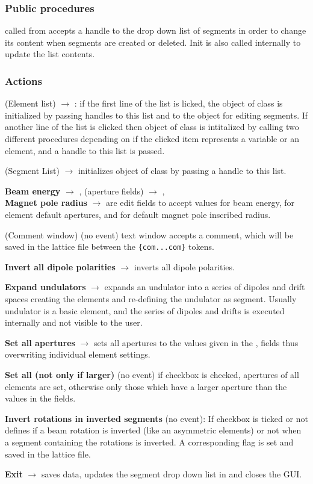 \documentclass[12pt]{article}
\newcommand\code[1]{{\tt #1}}
\newcommand{\ofld}[1]{\colorbox{black!15}{{\bf #1}}}
\newcommand{\ofldx}[1]{\colorbox{black!15}{(#1)}}
\newcommand\guico[1]{{\color{blue}\code{#1}}}
\newcommand{\unico}[1]{{\color{burntorange}\code{#1}}}
\newcommand{\evcod}[2]{\ofld{#1} $\rightarrow$ \guico{#2}}
\newcommand{\evcodx}[2]{\ofldx{#1} $\rightarrow$ \guico{#2}}
\newcommand{\opagui}[1]{\colorbox{blue!20}{{\color{black}\code{#1}}}}
\newcommand{\ogui}[1]{\hyperref[#1]{\opagui{#1}}}
\newcommand{\act}[1]{\subsubsection*{Actions} #1}
\newcommand{\ppro}[1]{\subsubsection*{Public procedures} #1}
\begin{document}
\ppro{
\guico{Init} called from \ogui{opamenu} accepts a handle to the drop down list of segments in order to change its content when segments are created or deleted. Init is also called internally to update the list contents.
}

\act{
\evcodx{Element list}{ListBoxEClick}: if the first line of the list is licked, the object \guico{EditElemCreate} of class \ogui{oelecreate} is initialized by passing handles to this list and to the \ogui{osegedit} object for editing segments. If another line of the list is clicked then object \guico{EditElemSet} of class \ogui{oeleedit} is intitalized by calling two different procedures depending on if the clicked item represents a variable or an element, and a handle to this list is passed.

\evcodx{Segment List}{ListBoxSClick} initializes object \guico{EditSegSet} of class \ogui{osegedit} by passing a handle to this list.

\evcod{Beam energy}{EditGloEKeyPress}, \evcodx{aperture fields}{EditA*KeyPress},\\ \evcod{Magnet pole radius}{EdrrefKeyPress} are edit fields to accept values for beam energy, for element default apertures, and for default magnet pole inscribed radius.

\ofldx{Comment window} (no event) text window \guico{MemCom} accepts a comment, which will be saved in the lattice file between the \code{\{com...com\}} tokens.

\evcod{Invert all dipole polarities}{ButDipInv} inverts all dipole polarities.

\evcod{Expand undulators}{ButExpUndClick} expands an undulator into a series of dipoles and drift spaces creating the elements and re-defining the undulator as segment. Usually undulator is a basic element, and the series of dipoles and drifts is executed internally and not visible to the user.

\evcod{Set all apertures}{ButAllAperClick} sets all apertures to the values given in the \guico{EditAx}, \guico{EditAy} fields thus overwriting individual element settings. 

\ofld{Set all (not only if larger)} (no event) if checkbox \guico{ChkAll} is checked, apertures of all elements are set, otherwise only those which have a larger aperture than the values in the fields.

\ofld{Invert rotations in inverted segments} (no event): If  checkbox \guico{ChkGloRi} is ticked or not defines if a beam rotation is inverted (like an asymmetric elements) or not when a segment containing the rotations is  inverted. A corresponding flag \unico{glob.rot\_inv} is set and saved in the lattice file.

\evcod{Exit}{ButExit} saves data, updates the segment drop down list in \ogui{opamenu} and closes the GUI.
}
\end{document}
